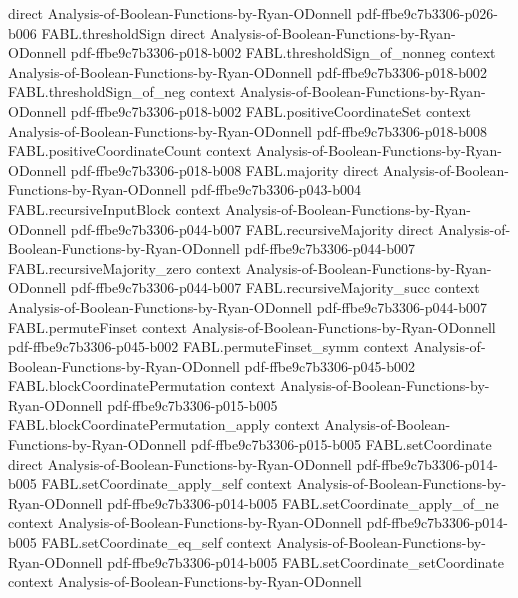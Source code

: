 \begin{theorem}
  {direct}
  {Analysis-of-Boolean-Functions-by-Ryan-ODonnell}
  {pdf-ffbe9c7b3306-p026-b006}
\proofstep
  {FABL.thresholdSign}
  {direct}
  {Analysis-of-Boolean-Functions-by-Ryan-ODonnell}
  {pdf-ffbe9c7b3306-p018-b002}
\proofstep
  {FABL.thresholdSign_of_nonneg}
  {context}
  {Analysis-of-Boolean-Functions-by-Ryan-ODonnell}
  {pdf-ffbe9c7b3306-p018-b002}
\proofstep
  {FABL.thresholdSign_of_neg}
  {context}
  {Analysis-of-Boolean-Functions-by-Ryan-ODonnell}
  {pdf-ffbe9c7b3306-p018-b002}
\proofstep
  {FABL.positiveCoordinateSet}
  {context}
  {Analysis-of-Boolean-Functions-by-Ryan-ODonnell}
  {pdf-ffbe9c7b3306-p018-b008}
\proofstep
  {FABL.positiveCoordinateCount}
  {context}
  {Analysis-of-Boolean-Functions-by-Ryan-ODonnell}
  {pdf-ffbe9c7b3306-p018-b008}
\proofstep
  {FABL.majority}
  {direct}
  {Analysis-of-Boolean-Functions-by-Ryan-ODonnell}
  {pdf-ffbe9c7b3306-p043-b004}
\proofstep
  {FABL.recursiveInputBlock}
  {context}
  {Analysis-of-Boolean-Functions-by-Ryan-ODonnell}
  {pdf-ffbe9c7b3306-p044-b007}
\proofstep
  {FABL.recursiveMajority}
  {direct}
  {Analysis-of-Boolean-Functions-by-Ryan-ODonnell}
  {pdf-ffbe9c7b3306-p044-b007}
\proofstep
  {FABL.recursiveMajority_zero}
  {context}
  {Analysis-of-Boolean-Functions-by-Ryan-ODonnell}
  {pdf-ffbe9c7b3306-p044-b007}
\proofstep
  {FABL.recursiveMajority_succ}
  {context}
  {Analysis-of-Boolean-Functions-by-Ryan-ODonnell}
  {pdf-ffbe9c7b3306-p044-b007}
\proofstep
  {FABL.permuteFinset}
  {context}
  {Analysis-of-Boolean-Functions-by-Ryan-ODonnell}
  {pdf-ffbe9c7b3306-p045-b002}
\proofstep
  {FABL.permuteFinset_symm}
  {context}
  {Analysis-of-Boolean-Functions-by-Ryan-ODonnell}
  {pdf-ffbe9c7b3306-p045-b002}
\proofstep
  {FABL.blockCoordinatePermutation}
  {context}
  {Analysis-of-Boolean-Functions-by-Ryan-ODonnell}
  {pdf-ffbe9c7b3306-p015-b005}
\proofstep
  {FABL.blockCoordinatePermutation_apply}
  {context}
  {Analysis-of-Boolean-Functions-by-Ryan-ODonnell}
  {pdf-ffbe9c7b3306-p015-b005}
\proofstep
  {FABL.setCoordinate}
  {direct}
  {Analysis-of-Boolean-Functions-by-Ryan-ODonnell}
  {pdf-ffbe9c7b3306-p014-b005}
\proofstep
  {FABL.setCoordinate_apply_self}
  {context}
  {Analysis-of-Boolean-Functions-by-Ryan-ODonnell}
  {pdf-ffbe9c7b3306-p014-b005}
\proofstep
  {FABL.setCoordinate_apply_of_ne}
  {context}
  {Analysis-of-Boolean-Functions-by-Ryan-ODonnell}
  {pdf-ffbe9c7b3306-p014-b005}
\proofstep
  {FABL.setCoordinate_eq_self}
  {context}
  {Analysis-of-Boolean-Functions-by-Ryan-ODonnell}
  {pdf-ffbe9c7b3306-p014-b005}
\proofstep
  {FABL.setCoordinate_setCoordinate}
  {context}
  {Analysis-of-Boolean-Functions-by-Ryan-ODonnell}

\end{theorem}
